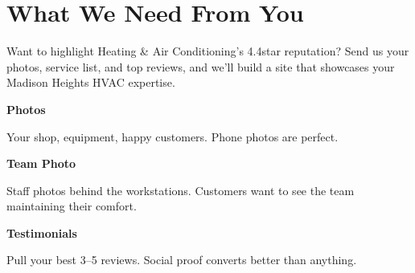 \documentclass[11pt,letterpaper]{article}
\begin{document}
\vspace{0.2em}

\section*{What We Need From You}

Want to highlight Heating \& Air Conditioning’s 4.4\textendash star reputation? Send us your photos, service list, and top reviews, and we’ll build a site that showcases your Madison Heights HVAC expertise.

\vspace{0.12em}

\noindent\begin{minipage}[t]{0.48\textwidth}
\begin{tcolorbox}[colframe=accent-teal, boxrule=1pt, left=0.7em, right=0.7em, top=0.5em, bottom=0.5em, arc=4pt, boxsep=0pt]
{\bfseries\small\color{accent-teal}Photos}

\vspace{0.15em}

{\small Your shop, equipment, happy customers. Phone photos are perfect.}
\end{tcolorbox}

\vspace{0.1em}

\begin{tcolorbox}[colframe=accent-teal, boxrule=1pt, left=0.7em, right=0.7em, top=0.5em, bottom=0.5em, arc=4pt, boxsep=0pt]
{\bfseries\small\color{accent-teal}Team Photo}

\vspace{0.15em}

{\small Staff photos behind the workstations. Customers want to see the team maintaining their comfort.}
\end{tcolorbox}

\vspace{0.1em}

\begin{tcolorbox}[colframe=accent-teal, boxrule=1pt, left=0.7em, right=0.7em, top=0.5em, bottom=0.5em, arc=4pt, boxsep=0pt]
{\bfseries\small\color{accent-teal}Testimonials}

\vspace{0.15em}

{\small Pull your best 3--5 reviews. Social proof converts better than anything.}
\end{tcolorbox}
\end{minipage}
\hfill
\end{document}

